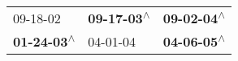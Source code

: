 \begin{supertabular}{lll}
                  09-18-02\textsuperscript{} &  \textbf{09-17-03\textsuperscript{$\wedge$}} &  \textbf{09-02-04\textsuperscript{$\wedge$}} \\
 \textbf{01-24-03\textsuperscript{$\wedge$}} &                   04-01-04\textsuperscript{} &  \textbf{04-06-05\textsuperscript{$\wedge$}} \\
\end{supertabular}
